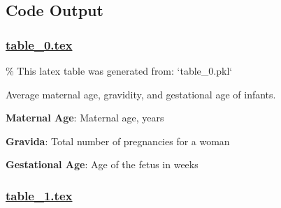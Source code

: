 \documentclass[11pt]{article}
\begin{document}
\subsection{Code Output}

\subsubsection*{\hyperlink{code-LaTeX Table Design-table-0-tex}{table\_0.tex}}

\begin{codeoutput}
\% This latex table was generated from: `table\_0.pkl`
\begin{table}[h]
\caption{Summary of Maternal Age, Gravida, and Gestational Age.}
\label{table:Summary\_Stats}
\begin{threeparttable}
\renewcommand{\TPTminimum}{\linewidth}
\begin{tablenotes}
\footnotesize
\item Average maternal age, gravidity, and gestational age of infants.
\item \textbf{Maternal Age}: Maternal age, years
\item \textbf{Gravida}: Total number of pregnancies for a woman
\item \textbf{Gestational Age}: Age of the fetus in weeks
\end{tablenotes}
\end{threeparttable}
\end{table}

\end{codeoutput}

\subsubsection*{\hyperlink{code-LaTeX Table Design-table-1-tex}{table\_1.tex}}
\end{document}
